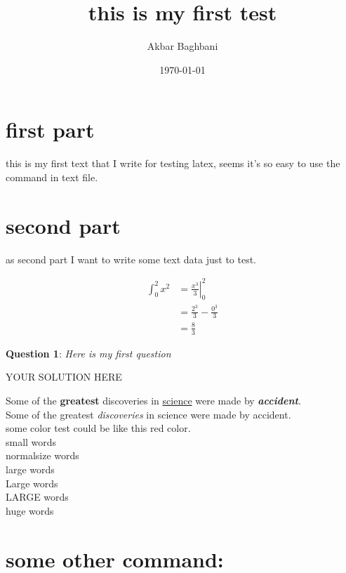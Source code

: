 \documentclass{article} %
\newcommand{\question}[2][]{\begin{flushleft}
    \textbf{Question #1}: \textit{#2}
\end{flushleft}}
\begin{document}
\title{this is my first test}
\author{Akbar Baghbani}
\date{\today}
\maketitle

\tableofcontents
\newpage
{}
\section{first part}
    this is my first text that I write for testing latex, seems it's so easy to use the command in text file.

    \section{second part}
    as second part I want to write some text data just to test.

    \begin{align*}
        \int_0^2 x^2 &= \left. \frac{x^3}{3} \right|_0^2 \\
                     &= \frac{2^3}{3}-\frac{0^3}{3}\\
                     &= \frac{8}{3}
    \end{align*}

    \question[1]{Here is my first question} 
    
    YOUR SOLUTION HERE

    Some of the \textbf{greatest}
    discoveries in \underline{science} 
    were made by \textbf{\textit{accident}}. \\
    Some of the greatest \emph{discoveries} in science were made by accident.\\
    some color test could be like this {\color{red} red color}.\\
    {\small small words}\\
    {\normalsize normalsize words}\\
    {\large large words}\\
    {\Large Large words}\\
    {\LARGE LARGE words}\\
    {\huge huge words}

    \section{some other command:}
\end{document}
